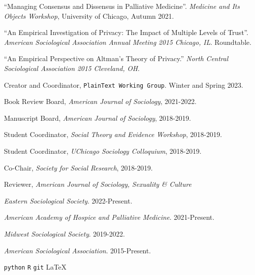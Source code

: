 \documentclass[11pt,article,oneside]{memoir}
\begin{document}
\ind ``Managing Consensus and Dissensus in Palliative Medicine''. \emph{Medicine and Its Objects Workshop}, University of Chicago, Autumn 2021. \vspace{0.05in}

\ind ``An Empirical Investigation of Privacy: The Impact of Multiple Levels of Trust''. \emph{American Sociological Association Annual Meeting 2015 Chicago, IL}. Roundtable. {\vskip 5pt}

\ind ``An Empirical Perspective on Altman's Theory of Privacy.'' \emph{North Central Sociological Association 2015 Cleveland, OH}.

\normalsize

\medskip
{}
\medskip

\ind  Creator and Coordinator, \texttt{PlainText Working Group}. Winter and Spring 2023.

\ind Book Review Board, \emph{American Journal of Sociology}, 2021-2022.

\ind Manuscript Board, \emph{American Journal of Sociology}, 2018-2019.

\ind Student Coordinator, \emph{Social Theory and Evidence Workshop}, 2018-2019.

\ind Student Coordinator, \emph{UChicago Sociology Colloquium}, 2018-2019.

\ind Co-Chair, \emph{Society for Social Research}, 2018-2019.

\ind Reviewer, \emph{American Journal of Sociology, Sexuality \& Culture}

\newpage

\medskip
{}
\medskip

\ind \emph{Eastern Sociological Society}. 2022-Present.

\ind \emph{American Academy of Hospice and Palliative Medicine}. 2021-Present.

\ind \emph{Midwest Sociological Society}. 2019-2022.

\ind \emph{American Sociological Association}. 2015-Present.

\bigskip
{}

\medskip

\ind  \texttt{python} \hspace{0.4in}  \texttt{R} \hspace{0.4in} \texttt{git} \hspace{0.4in} \LaTeX
\end{document}
